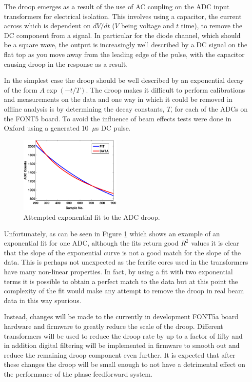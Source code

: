 The droop emerges as a result of the use of AC coupling on the ADC input transformers for electrical isolation. This involves using a capacitor, the current across which is dependent on \({dV}/{dt}\) (\(V\) being voltage and \(t\) time), to remove the DC component from a signal. In particular for the diode channel, which should be a square wave, the output is increasingly well described by a DC signal on the flat top as you move away from the leading edge of the pulse, with the capacitor causing droop in the response as a result.

In the simplest case the droop should be well described by an exponential decay of the form \(A\exp\left(-t/T\right)\). The droop makes it difficult to perform calibrations and measurements on the data and one way in which it could be removed in offline analysis is by determining the decay constants, \(T\), for each of the ADCs on the FONT5 board. To avoid the influence of beam effects tests were done in Oxford using a generated 10~\(\mu\)s DC pulse.

\begin{figure}
  \centering
  \includegraphics[width=0.45\textwidth]{Figures/commissioning/droopFit}
  \caption{Attempted exponential fit to the ADC droop.}
  \label{f:droopFit}
\end{figure}

Unfortunately, as can be seen in Figure \ref{f:droopFit} which shows an example of an exponential fit for one ADC, although the fits return good \(R^{2}\) values it is clear that the slope of the exponential curve is not a good match for the slope of the data. This is perhaps not unexpected as the ferrite cores used in the transformers have many non-linear properties. In fact, by using a fit with two exponential terms it is possible to obtain a perfect match to the data but at this point the complexity of the fit would make any attempt to remove the droop in real beam data in this way spurious.

Instead, changes will be made to the currently in development FONT5a board hardware and firmware to greatly reduce the scale of the droop. Different transformers will be used to reduce the droop rate by up to a factor of fifty and in addition digital filtering will be implemented in firmware to smooth out and reduce the remaining droop component even further. It is expected that after these changes the droop will be small enough to not have a detrimental effect on the performance of the phase feedforward system. 


